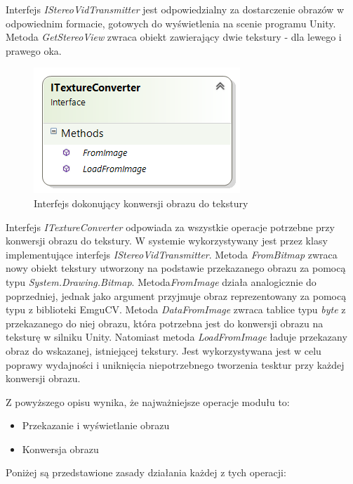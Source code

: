 \documentclass[a4paper,11pt,twoside]{report}
\theoremstyle{definition}
\begin{document}
Interfejs \textit{IStereoVidTransmitter} jest odpowiedzialny za dostarczenie obrazów w odpowiednim formacie, gotowych do wyświetlenia na scenie programu Unity. Metoda \textit{GetStereoView} zwraca obiekt zawierający dwie tekstury - dla lewego i prawego oka. 

\begin{figure}[h]
\centering
\includegraphics[scale=0.9]{images/ITextureConverter}
\caption[Konwersja diagram]{Interfejs dokonujący konwersji obrazu do tekstury}
\end{figure}

\begin{minipage}{\linewidth}
Interfejs \textit{ITextureConverter} odpowiada za wszystkie operacje potrzebne przy konwersji obrazu do tekstury. W systemie wykorzystywany jest przez klasy implementujące interfejs \textit{IStereoVidTransmitter}. Metoda \textit{FromBitmap} zwraca nowy obiekt tekstury utworzony na podstawie przekazanego obrazu za pomocą typu \textit{System.Drawing.Bitmap}. Metoda\textit{FromImage} działa analogicznie do poprzedniej, jednak jako argument przyjmuje obraz reprezentowany za pomocą typu z biblioteki EmguCV.
Metoda \textit{DataFromImage} zwraca tablice typu \textit{byte} z przekazanego do niej obrazu, która potrzebna jest do konwersji obrazu na teksturę w silniku Unity. Natomiast metoda \textit{LoadFromImage}  ładuje przekazany obraz do wskazanej, istniejącej tekstury. Jest wykorzystywana jest w celu poprawy wydajności i uniknięcia niepotrzebnego tworzenia tesktur przy każdej konwersji obrazu.
\end{minipage}

Z powyższego opisu wynika, że najważniejsze operacje modułu to:
\begin{itemize}
\item Przekazanie i wyświetlanie obrazu
\item Konwersja obrazu
\end{itemize}

Poniżej są przedstawione zasady działania każdej z tych operacji:
\end{document}
